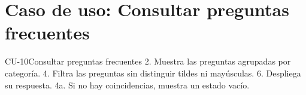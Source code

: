 \section*{Caso de uso: Consultar preguntas frecuentes}

\begin{table}[H]
\centering
\caption{Especificación del caso de uso CU-10.}
\label{tab:cu-10}
\begin{especificacioncu}{CU-10}{Consultar preguntas frecuentes}
           {2. Muestra las preguntas agrupadas por categoría.}
           {4. Filtra las preguntas sin distinguir tildes ni mayúsculas.}
           {6. Despliega su respuesta.}
    \cufinflujo
    \cupaso{}
           {4a. Si no hay coincidencias, muestra un estado vacío.}
    \cufinflujo
\end{especificacioncu}
\end{table}
